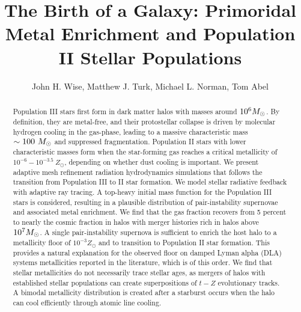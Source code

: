 \documentclass[12pt,preprint]{aastex}
\newcommand{\Ms}{\ifmmode{M_\odot}\else{$M_\odot$}\fi}
\begin{document}

\title{The Birth of a Galaxy: Primoridal Metal Enrichment and
  Population II Stellar Populations}

\author{John H. Wise, 
  Matthew J. Turk,
  Michael L. Norman,
  Tom Abel}


\begin{abstract}

  Population III stars first form in dark matter halos with masses
  around $10^6 \Ms$.  By definition, they are metal-free, and their
  protostellar collapse is driven by molecular hydrogen cooling in the
  gas-phase, leading to a massive characteristic mass $\sim 100~\Ms$
  and suppressed fragmentation.  Population II stars with lower
  characteristic masses form when the star-forming gas reaches a
  critical metallicity of $10^{-6} - 10^{-3.5}~Z_\odot$, depending on
  whether dust cooling is important.  We present adaptive mesh
  refinement radiation hydrodynamics simulations that follows the
  transition from Population III to II star formation.  We model
  stellar radiative feedback with adaptive ray tracing.  A top-heavy
  initial mass function for the Population III stars is considered,
  resulting in a plausible distribution of pair-instability supernovae
  and associated metal enrichment.  We find that the gas fraction
  recovers from 5 percent to nearly the cosmic fraction in halos with
  merger histories rich in halos above $10^7 \Ms$.  A single
  pair-instability supernova is sufficient to enrich the host halo to
  a metallicity floor of $10^{-3} Z_\odot$ and to transition to
  Population II star formation.  This provides a natural explanation
  for the observed floor on damped Lyman alpha (DLA) systems
  metallicities reported in the literature, which is of this order.
  We find that stellar metallicities do not necessarily trace stellar
  ages, as mergers of halos with established stellar populations can
  create superpositions of $t-Z$ evolutionary tracks.  A bimodal
  metallicity distribution is created after a starburst occurs when
  the halo can cool efficiently through atomic line cooling.

\end{abstract}
\end{document}
